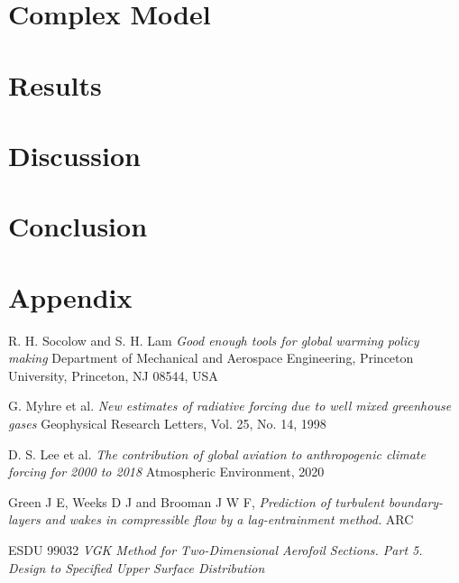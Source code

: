 \documentclass{article}
\begin{document}
\section{Complex Model}





\section{Results}

\section{Discussion}

\section{Conclusion}

\section{Appendix}



\begin{thebibliography}{9}


    R. H. Socolow and S. H. Lam
    \emph{Good enough tools for global warming policy making}
    Department of Mechanical and Aerospace Engineering, Princeton University,
    Princeton, NJ 08544, USA

    G. Myhre et al.
    \emph{New estimates of radiative forcing due to well mixed greenhouse gases}
    Geophysical Research Letters, Vol. 25, No. 14, 1998

    D. S. Lee et al.
    \emph{The contribution of global aviation to anthropogenic climate forcing for 2000 to 2018}
    Atmospheric Environment, 2020

    Green J E, Weeks D J and Brooman J W F,
    \emph{Prediction of turbulent boundary-layers and wakes in compressible flow by a lag-entrainment method.}
    ARC

    ESDU 99032
    \emph{VGK Method for Two-Dimensional Aerofoil Sections. Part 5. Design to Specified Upper Surface Distribution}
  
\end{thebibliography}
\end{document}
